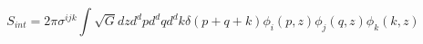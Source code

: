 \begin{equation}
S_{int}= 2\pi \sigma^{ijk} \int \sqrt{G} dz d^dp d^dq d^dk \delta(p+q+k)
\phi_i(p,z) \phi_j(q,z) \phi_k(k,z)
\end{equation}

